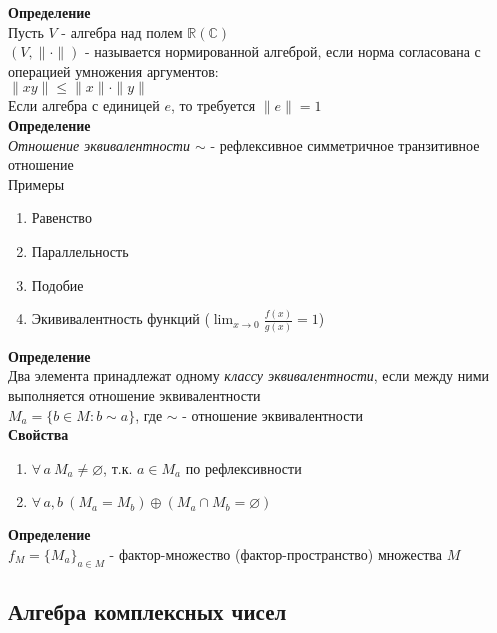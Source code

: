 \documentclass[12pt]{article}
\begin{document}
\textbf{Определение}\\
Пусть $V$ - алгебра над полем $\mathbb{R}(\mathbb{C})$\\
$(V,\|\cdot\|)$ - называется нормированной алгеброй, если норма согласована с операцией умножения аргументов:\\
$\|xy\| \leq \|x\|\cdot\|y\|$\\
Если алгебра с единицей $e$, то требуется $\|e\| = 1$\\
\textbf{Определение}\\
\textit{Отношение эквивалентности $\sim$} - рефлексивное симметричное транзитивное отношение\\
Примеры
\begin{enumerate}
    \item Равенство
    \item Параллельность
    \item Подобие
    \item Экививалентность функций ($\lim_{x\rightarrow 0} \frac{f(x)}{g(x)} = 1$)
\end{enumerate}
\textbf{Определение}\\
Два элемента принадлежат одному \textit{классу эквивалентности}, если между ними выполняется отношение эквивалентности\\
$M_a = \{b\in M: b \sim a\}$, где $\sim$ - отношение эквивалентности\\
\textbf{Свойства}
\begin{enumerate}
    \item $\forall\,a\ M_a \neq \varnothing$, т.к. $a \in M_a$ по рефлексивности
    \item $\forall\,a,b\ (M_a = M_b) \oplus (M_a \cap M_b = \varnothing)$
\end{enumerate}
\textbf{Определение}\\
$f_M=\{M_a\}_{a \in M}$ - фактор-множество (фактор-пространство) множества $M$
\subsection{Алгебра комплексных чисел}
\end{document}
